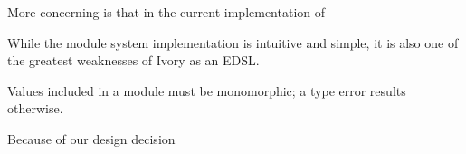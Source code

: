 More concerning is that in the current implementation of 






While the module system implementation is intuitive and simple, it is also one
of the greatest weaknesses of Ivory as an EDSL. 

Values included in a module must be monomorphic; a type error results
otherwise. 

Because of our design decision 







